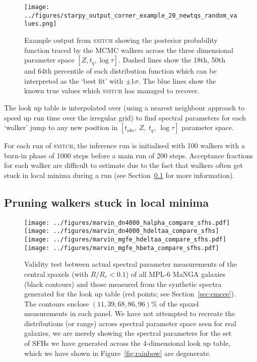 \documentclass[useAMS,usenatbib]{mn2e}
\begin{document}
\begin{figure*}
\centering
\texttt{[image: ../figures/starpy\_output\_corner\_example\_20\_newtqs\_random\_values.png]}
\caption{Example output from \textsc{snitch} showing the posterior probability function traced by the MCMC walkers across the three dimensional parameter space $[Z, t_q, \log\tau]$. Dashed lines show the 18th, 50th and 64th percentile of each distribution function which can be interpreted as the `best fit' with $±1\sigma$. The blue lines show the known true values which \textsc{snitch} has managed to recover.}
\label{fig:output}
\end{figure*}
 
The look up table is interpolated over (using a nearest neighbour approach to speed up run time over the irregular grid) to find spectral parameters for each `walker' jump to any new position in $[t_{obs},~Z,~t_q,~\log\tau]$ parameter space. 

For each run of \textsc{snitch}, the inference run is initialised with 100 walkers with a burn-in phase of 1000 steps before a main run of 200 steps. Acceptance fractions for each walker are difficult to estimate due to the fact that walkers often get stuck in local minima during a run (see Section~\ref{sec:pruning} for more information). 



\subsection{Pruning walkers stuck in local minima}\label{sec:pruning}

\begin{figure*}
\centering
\texttt{[image: ../figures/marvin\_dn4000\_halpha\_compare\_sfhs.pdf]}
\texttt{[image: ../figures/marvin\_dn4000\_hdeltaa\_compare\_sfhs]}
\texttt{[image: ../figures/marvin\_mgfe\_hdeltaa\_compare\_sfhs.pdf]}
\texttt{[image: ../figures/marvin\_mgfe\_hbeta\_compare\_sfhs.pdf]}
\caption{Validity test between actual spectral parameter measurements of the central spaxels (with $R/R_e < 0.1$) of all MPL-6 MaNGA galaxies (black contours) and those measured from the synthetic spectra generated for the look up table (red points; see Section~\ref{sec:emcee}). The contours enclose $(11, 39, 68, 86, 96)\%$ of the spaxel measurements in each panel. We have not attempted to recreate the distributions (or range) across spectral parameter space seen for real galaxies, we are merely showing the spectral parameters for the set of SFHs we have generated across the 4-dimensional look up table, which we have shown in Figure~\ref{fig:rainbow} are degenerate.}
\label{fig:compare_manga_specmeas}
\end{figure*}
\end{document}
